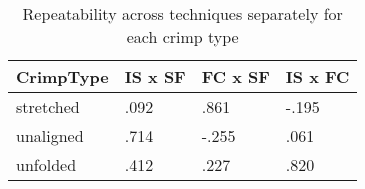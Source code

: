 %

\begin{table}[htp]
\centering
\caption{Repeatability across techniques separately for each crimp type}
\label{tab:arepty}
\vspace{0.1in}
\begin{tabular}{|p{1.0in}|p{1.0in}|p{0.9in}|p{0.9in}} \hline
     CrimpType  & IS x SF & FC x SF & IS x FC \\  \hline
  stretched     & .092  & .861 & -.195   \\
  unaligned     & .714  & -.255 & .061  \\
  unfolded      & .412  & .227 &  .820\\ \hline
\end{tabular}
\end{table}

%
